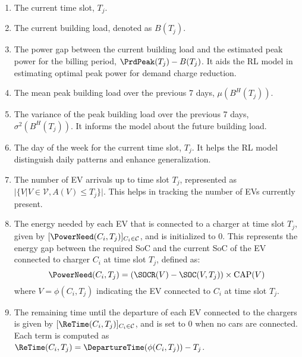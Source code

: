    
    \begin{enumerate}[leftmargin=*]
    \item The current time slot, $T_j$.
    \item The current building load, denoted as ${B}(T_j)$.
    \item The power gap between the current building load and the estimated peak power for the billing period, $ \PrdPeak(T_j) - {B}(T_j)$. It aids the RL model in estimating optimal peak power for demand charge reduction.
    \item The mean peak building load over the previous 7 days, $\mu(B^H(T_j))$.
    \item The variance of the peak building load over the previous 7 days, $\sigma^2(B^H(T_j))$. It informs the model about the future building load.  
    \item The day of the week for the current time slot, $T_j$. It helps the RL model distinguish daily patterns and enhance generalization.
    \item The number of EV arrivals up to time slot $T_j$, represented as $|\{V | V \in \mathcal{V}, A(V) \leq T_j \}|$. This helps in tracking the number of EVs currently present.
    \item The energy needed by each EV that is connected to a charger at time slot $T_j$, given by $[\PowerNeed(C_i, T_j)]_{C_i \in \mathcal{C}}$, and is initialized to $0$. This represents the energy gap between the required SoC and the current SoC of the EV connected to charger $C_i$ at time slot $T_j$, defined as: 
    \begin{equation} 
     \PowerNeed(C_i, T_j) = (\SOCR(V) - \SOC(V, T_j)) \times \text{CAP}(V)
     \label{eq:chargerstate}
    \end{equation}
    where $V=\phi(C_i, T_j)$ indicating the EV connected to $C_i$ at time slot $T_j$. 
    \item The remaining time until the departure of each EV connected to the chargers is given by $[\ReTime(C_i, T_j)]_{C_i \in \mathcal{C}}$, and is set to 0 when no cars are connected. Each term is computed as $\ReTime(C_i, T_j) = \DepartureTime(\phi(C_i, T_j)) - T_j$. 
\end{enumerate} 
